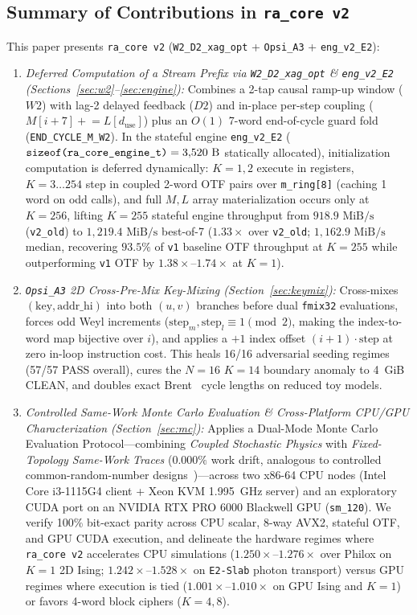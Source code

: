 \documentclass[conference]{IEEEtran}
\begin{document}
\subsection{Summary of Contributions in \texttt{ra\_core v2}}

This paper presents \texttt{ra\_core v2} (\texttt{W2\_D2\_xag\_opt} + \texttt{Opsi\_A3} + \texttt{eng\_v2\_E2}):
\begin{enumerate}
    \item \emph{Deferred Computation of a Stream Prefix via \texttt{W2\_D2\_xag\_opt} \& \texttt{eng\_v2\_E2} (Sections~\ref{sec:w2}--\ref{sec:engine}):} Combines a 2-tap causal ramp-up window ($W2$) with lag-2 delayed feedback ($D2$) and in-place per-step coupling ($M[i+7] \mathrel{+}= L[d_{\text{use}}]$) plus an $O(1)$ 7-word end-of-cycle guard fold (\texttt{END\_CYCLE\_M\_W2}). In the stateful engine \texttt{eng\_v2\_E2} ($\text{\texttt{sizeof(ra\_core\_engine\_t)}} = 3{,}520\text{ B}$ statically allocated), initialization computation is deferred dynamically: $K=1, 2$ execute in registers, $K=3\ldots 254$ step in coupled 2-word OTF pairs over \texttt{m\_ring[8]} (caching 1 word on odd calls), and full $M, L$ array materialization occurs only at $K=256$, lifting $K=255$ stateful engine throughput from $918.9\text{ MiB/s}$ (\texttt{v2\_old}) to $1{,}219.4\text{ MiB/s}$ best-of-7 ($1.33\times$ over \texttt{v2\_old}; $1{,}162.9\text{ MiB/s}$ median, recovering $93.5\%$ of \texttt{v1} baseline OTF throughput at $K=255$ while outperforming \texttt{v1} OTF by $1.38\times$--$1.74\times$ at $K=1$).
    \item \emph{\texttt{Opsi\_A3} 2D Cross-Pre-Mix Key-Mixing (Section~\ref{sec:keymix}):} Cross-mixes $(\text{key}, \text{addr\_hi})$ into both $(u, v)$ branches before dual \texttt{fmix32} evaluations, forces odd Weyl increments ($\text{step}_m, \text{step}_l \equiv 1 \pmod 2$, making the index-to-word map bijective over $i$), and applies a $+1$ index offset $(i+1)\cdot\text{step}$ at zero in-loop instruction cost. This heals 16/16 adversarial seeding regimes (57/57 PASS overall), cures the $N=16$ $K=14$ boundary anomaly to 4~GiB CLEAN, and doubles exact Brent~\cite{brent1980improved} cycle lengths on reduced toy models.
    \item \emph{Controlled Same-Work Monte Carlo Evaluation \& Cross-Platform CPU/GPU Characterization (Section~\ref{sec:mc}):} Applies a Dual-Mode Monte Carlo Evaluation Protocol---combining \emph{Coupled Stochastic Physics} with \emph{Fixed-Topology Same-Work Traces} ($0.000\%$ work drift, analogous to controlled common-random-number designs~\cite{law2015simulation})---across two x86-64 CPU nodes (Intel Core i3-1115G4 client + Xeon KVM 1.995~GHz server) and an exploratory CUDA port on an NVIDIA RTX PRO 6000 Blackwell GPU (\texttt{sm\_120}). We verify 100\% bit-exact parity across CPU scalar, 8-way AVX2, stateful OTF, and GPU CUDA execution, and delineate the hardware regimes where \texttt{ra\_core v2} accelerates CPU simulations ($1.250\times$--$1.276\times$ over Philox on $K=1$ 2D Ising; $1.242\times$--$1.528\times$ on \texttt{E2-Slab} photon transport) versus GPU regimes where execution is tied ($1.001\times$--$1.010\times$ on GPU Ising and $K=1$) or favors 4-word block ciphers ($K=4, 8$).
\end{enumerate}
\end{document}
